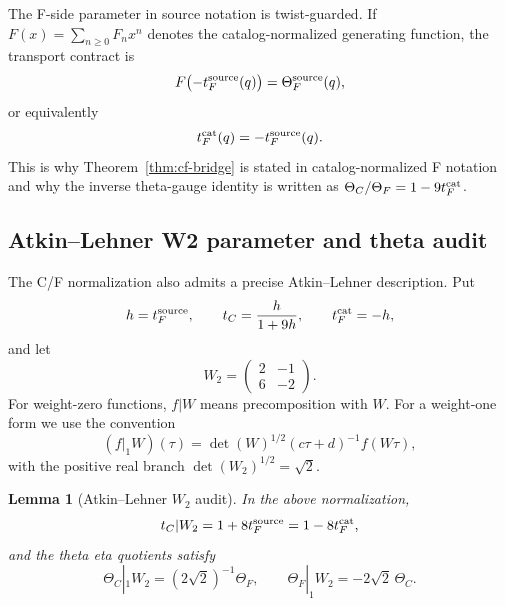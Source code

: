 \documentclass[11pt,a4paper]{article}
\newtheorem{lemma}[theorem]{Lemma}
\begin{document}
The F-side parameter in source notation is twist-guarded.  If
$F(x)=\sum_{n\ge0}F_nx^n$ denotes the catalog-normalized generating function,
the transport contract is
\[
  F\bigl(-t_F^{\rm source}(q)\bigr)=\Theta_F^{\rm source}(q),
\]
or equivalently
\[
  t_F^{\rm cat}(q)=-t_F^{\rm source}(q).
\]
This is why Theorem~\ref{thm:cf-bridge} is stated in catalog-normalized F
notation and why the inverse theta-gauge identity is written as
$\Theta_C/\Theta_F=1-9t_F^{\rm cat}$.

\subsection{Atkin--Lehner W2 parameter and theta audit}
\label{app:al-w2}

The C/F normalization also admits a precise Atkin--Lehner description.  Put
\[
  h=t_F^{\rm source},\qquad t_C=\frac{h}{1+9h},
  \qquad t_F^{\rm cat}=-h,
\]
and let
\[
  W_2=\begin{pmatrix}2&-1\\6&-2\end{pmatrix}.
\]
For weight-zero functions, \(f|W\) means precomposition with \(W\).  For a
weight-one form we use the convention
\[
  (f|_1W)(\tau)=\det(W)^{1/2}(c\tau+d)^{-1}f(W\tau),
\]
with the positive real branch \(\det(W_2)^{1/2}=\sqrt{2}\).

\begin{lemma}[Atkin--Lehner \(W_2\) audit]
\label{lem:al-w2-audit}
In the above normalization,
\[
  t_C|W_2=1+8t_F^{\rm source}=1-8t_F^{\rm cat},
\]
and the theta eta quotients satisfy
\[
  \Theta_C|_1W_2=(2\sqrt{2})^{-1}\Theta_F,
  \qquad
  \Theta_F|_1W_2=-2\sqrt{2}\,\Theta_C.
\]
\end{lemma}
\end{document}

